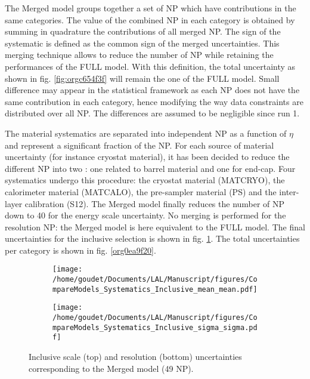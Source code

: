\begin{enumerate}
\begin{enumerate}
The Merged model groups together a set of NP which have contributions in the same categories.
The value of the combined NP in each category  is obtained by summing in quadrature the contributions of all merged NP.
The sign of the systematic is defined as the common sign of the merged uncertainties.
This merging technique allows to reduce the number of NP while retaining the performances of the FULL model.
With this definition, the total uncertainty as shown in fig. \ref{fig:orgc654f3f} will remain the one of the FULL model.
Small difference may appear in the statistical framework as each NP does not have the same contribution in each category, hence modifying the way data constraints are distributed over all NP.
The differences are assumed to be negligible since run 1.

The material systematics are separated into independent NP as a function of $\eta$ and represent a significant fraction of the NP.
For each source of material uncertainty (for instance cryostat material), it has been decided to reduce the different NP into two : one related to barrel material and one for end-cap.
Four systematics undergo this procedure: the cryostat material (MATCRYO), the calorimeter material (MATCALO), the pre-sampler material (PS) and the inter-layer calibration (S12).
The Merged model finally reduces the number of NP down to 40 for the energy scale uncertainty.
No merging is performed for the resolution NP: the Merged model is here equivalent to the FULL model.
The final uncertainties for the inclusive selection is shown in fig. \ref{org42d9a0c}.
The total uncertainties per category is shown in fig. \ref{org0ea9f20}.


\begin{figure}
\begin{subfigure}[t]{\linewidth}
\begin{center}
\texttt{[image: /home/goudet/Documents/LAL/Manuscript/figures/CompareModels\_Systematics\_Inclusive\_mean\_mean.pdf]}
\end{center}
\end{subfigure}
\begin{subfigure}[t]{\linewidth}
\begin{center}
\texttt{[image: /home/goudet/Documents/LAL/Manuscript/figures/CompareModels\_Systematics\_Inclusive\_sigma\_sigma.pdf]}
\end{center}
\end{subfigure}
\caption{\label{org42d9a0c}
Inclusive scale (top) and resolution (bottom) uncertainties corresponding to the Merged model (49 NP).}
\end{figure}



\end{enumerate}
\end{enumerate}
